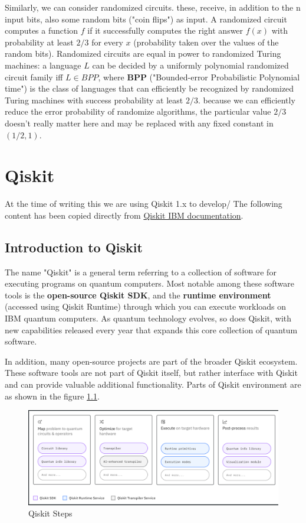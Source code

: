 \documentclass[12pt, oneside]{book}
\theoremstyle{definition}
\theoremstyle{definition}
\theoremstyle{remark}
\begin{document}
Similarly, we can consider randomized circuits. these, receive, in addition to the n input bits, also some random bits ("coin flips") as input. A randomized circuit computes a function $f$ if it successfully computes the right answer $f(x)$ with probability at least $2/3$ for every $x$ (probability taken over the values of the random bits). Randomized circuits are equal in power to randomized Turing machines: a language $L$ can be decided by a uniformly polynomial randomized circuit family iff $L \in BPP$, where $\mathbf{BPP}$ ("Bounded-error Probabilistic Polynomial time") is the class of languages that can efficiently be recognized by randomized Turing machines with success probability at least $2/3$. because we can efficiently reduce the error probability of randomize algorithms, the particular value $2/3$ doesn't really matter here and may be replaced with any fixed constant in $(1/2,1)$.






\chapter{Qiskit}
At the time of writing this we are using Qiskit 1.x to develop/ The following content has been copied directly from \href{https://docs.quantum.ibm.com/guides}{Qiskit IBM documentation}.
\section{Introduction to Qiskit}
The name "Qiskit" is a general term referring to a collection of software for executing programs on quantum computers. Most notable among these software tools is the \textbf{open-source Qiskit SDK}, and the \textbf{runtime environment} (accessed using Qiskit Runtime) through which you can execute workloads on IBM quantum computers. As quantum technology evolves, so does Qiskit, with new capabilities released every year that expands this core collection of quantum software.

In addition, many open-source projects are part of the broader Qiskit ecosystem. These software tools are not part of Qiskit itself, but rather interface with Qiskit and can provide valuable additional functionality. Parts of Qiskit environment are as shown in the figure \ref{fig:Qiskit}.

\begin{figure}
    \centering
    \includegraphics[width=1\linewidth]{../images/Qiskit.png}
    \caption{Qiskit Steps}
    \label{fig:Qiskit}
\end{figure}
\end{document}
